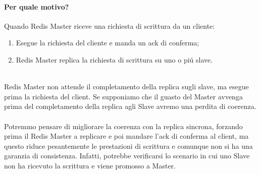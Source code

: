 \paragraph{Per quale motivo?\\}
Quando Redis Master riceve una richiesta di scrittura da un cliente:
\begin{enumerate}
    \item Esegue la richiesta del cliente e manda un ack di conferma;
    \item Redis Master replica la richiesta di scrittura su uno o piú slave.
\end{enumerate}
\\
Redis Master non attende il completamento della replica sugli slave, ma esegue prima la richiesta del client.
Se supponiamo che il guasto del Master avvenga prima del completamento della replica agli Slave avremo una perdita di coerenza.\\
\\
Potremmo pensare di migliorare la coerenza con la replica sincrona, forzando prima il Redis Master a replicare e poi mandare l'ack
di conferma al client, ma questo riduce pesantemente le prestazioni di scrittura e comunque non si ha una garanzia di consistenza.
Infatti, potrebbe verificarsi lo scenario in cui uno Slave non ha ricevuto la scrittura e viene promosso a Master.


